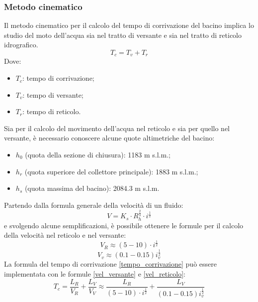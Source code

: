 \subsubsection{Metodo cinematico}
Il metodo cinematico per il calcolo del tempo di corrivazione del bacino implica lo studio del moto dell'acqua sia nel tratto di versante e sia nel tratto di reticolo idrografico.
\begin{equation}
    T_c = T_v + T_r
    \label{tempo_corrivazione}
\end{equation}
Dove:
\begin{itemize}
    \item $T_c$: tempo di corrivazione;
    \item $T_v$: tempo di versante;
    \item $T_r$: tempo di reticolo.
\end{itemize}
Sia per il calcolo del movimento dell'acqua nel reticolo e sia per quello nel versante, è necessario conoscere alcune quote altimetriche del bacino:
\begin{itemize}
    \item $h_0$ (quota della sezione di chiusura): 1183 m s.l.m.;
    \item $h_r$ (quota superiore del collettore principale): 1883 m s.l.m.;
    \item $h_s$ (quota massima del bacino): 2084.3 m s.l.m. 
\end{itemize}
Partendo dalla formula generale della velocità di un fluido: 
\begin{equation}
    V = K_s \cdot R_h^{\frac{2}{3}} \cdot i ^{\frac{1}{2}}
\end{equation}
e svolgendo alcune semplificazioni, è possibile ottenere le formule per il calcolo della velocità nel reticolo e nel versante:
\begin{equation}
    V_R \approx (5 - 10) \cdot i^{\frac{1}{2}}
    \label{vel_reticolo}
\end{equation}
\begin{equation}
    V_v \approx (0.1 - 0.15) i_v^{\frac{1}{2}}
    \label{vel_versante}
\end{equation}
La formula del tempo di corrivazione \ref{tempo_corrivazione} può essere implementata con le formule \ref{vel_versante} e \ref{vel_reticolo}:
\begin{equation}
    T_c = \frac{L_R}{V_R}+ \frac{L_V}{V_V} \approx \frac{L_R}{(5 - 10) \cdot i^{\frac{1}{2}}} + \frac{L_V}{(0.1 - 0.15) i_v^{\frac{1}{2}}}
\end{equation}

